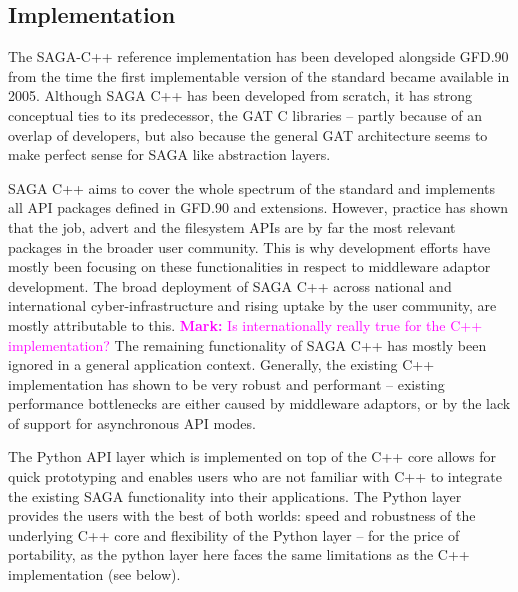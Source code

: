\documentclass{article}
\newcommand{\B}[1]{\textbf{#1}}
\newcommand{\msnote}[1]{{\textcolor{magenta}{ \B{Mark:    } #1 }}}
\newcommand{\msnote}[1]{}
\begin{document}
 \subsection{Implementation}

  The SAGA-C++ reference implementation has been developed alongside
  GFD.90 from the time the first implementable version of the standard
  became available in 2005. Although SAGA C++ has been developed from
  scratch, it has strong conceptual ties to its predecessor, the GAT
  C libraries -- partly because of an overlap of developers, but also
  because the general GAT architecture seems to make perfect sense for
  SAGA like abstraction layers.

  SAGA C++ aims to cover the whole spectrum of the standard and
  implements all API packages defined in GFD.90 and extensions.
  However, practice has shown that the job, advert and the filesystem
  APIs are by far the most relevant packages in the broader user
  community.  This is why development efforts have mostly been
  focusing on these functionalities in respect to middleware adaptor
  development.  The broad deployment of SAGA C++ across national and
  international cyber-infrastructure and rising uptake by the user
  community, are mostly attributable to this. \msnote{Is internationally
  really true for the C++ implementation?} The remaining
  functionality of SAGA C++ has mostly been ignored in a general
  application context.  Generally, the existing C++ implementation has
  shown to be very robust and performant -- existing performance
  bottlenecks are either caused by middleware adaptors, or by the lack
  of support for asynchronous API modes.  
  
  The Python API layer which is implemented on top of the C++ core
  allows for quick prototyping and enables users who are not familiar
  with C++ to integrate the existing SAGA functionality into their
  applications.  The Python layer provides the users with the best of
  both worlds: speed and robustness of the underlying C++ core and
  flexibility of the Python layer -- for the price of portability, as
  the python layer here faces the same limitations as the C++
  implementation (see below).
\end{document}
